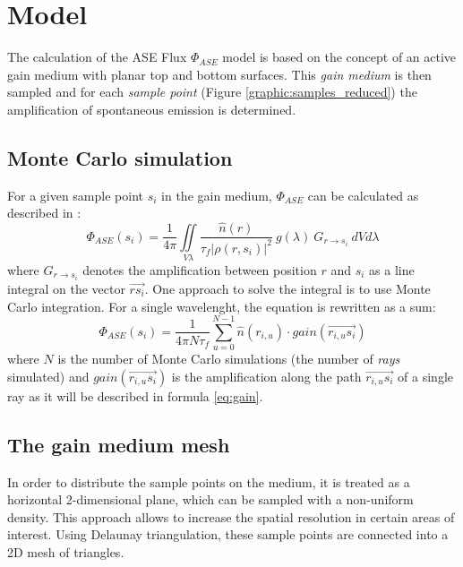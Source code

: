 \section{Model}

The calculation of the ASE Flux $\Phi_{ASE}$ model is based on the concept of an
active gain medium with planar top and bottom surfaces. This \emph{gain medium} is
then sampled and for each \emph{sample point} (Figure
\ref{graphic:samples_reduced}) the amplification of spontaneous emission is
determined. 


\subsection{Monte Carlo simulation}
\label{subsec:monteCarlo}

For a given sample point $s_i$ in the gain medium, $\Phi_{ASE}$ can
be calculated as described in \cite{ASE2010}:
\begin{equation}
  \label{eq:phi_ase_daniel} 
  \Phi_{ASE}(s_i)=\frac{1}{4\pi}\iint\limits_{V \lambda}
  \frac
    {\hat{n}(r)}
    {\tau_{f}|\rho(r,s_i)|^2}
  ~g(\lambda)
  ~G_{r\rightarrow s_i}
  ~dV d\lambda
\end{equation}
where $G_{r\rightarrow s_i}$ denotes the amplification between
position $r$ and $s_i$ as a line integral on the vector
$\overrightarrow{rs_i}$.  One approach to solve the integral is to use Monte
Carlo integration. For a single wavelenght, the equation is rewritten as a sum:
\begin{equation}
  \label{eq:monte_carlo_ase}
  \Phi_{ASE}(s_i) = 
  \frac{1}{4\pi N\tau_f}
  \sum^{N-1}_{u=0} \hat{n}(r_{i,u}) \cdot gain(\overrightarrow{r_{i,u}s_i})
\end{equation}
where $N$ is the number of Monte Carlo simulations (the number of \emph{rays}
simulated) and $gain(\overrightarrow{r_{i,u}s_i})$ is the amplification along the
path $\overrightarrow{r_{i,u}s_i}$ of a single ray as it will be described in
formula \eqref{eq:gain}. 


\subsection{The gain medium mesh} \label{subsec:meshSampling}

In order to distribute the sample points on the medium, it is treated as
a horizontal 2-dimensional plane, which can be sampled with a non-uniform
density. This approach allows to increase the spatial resolution in certain
areas of interest. Using Delaunay triangulation, these sample points are
connected into a 2D mesh of triangles.

